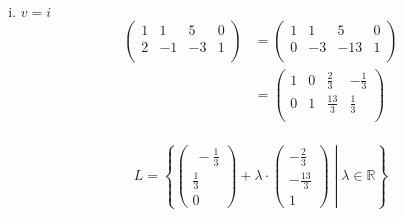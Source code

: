 \documentclass{article}
\begin{document}
\begin{enumerate}[(i)]
\begin{align*}
\begin{array}{cccc|c}
      0 & 1 & 0 & 0  & -\frac{14}{37} \\
      0 & 0 & 1 & 0  & \frac{57}{37}  \\
      0 & 0 & 0 & 1  & \frac{3}{37}   \\
    \end{array}
    \right) \\
  \end{align*}
  \[
    L = \left\{\begin{pmatrix}-\frac{1}{37} \\ -\frac{14}{37} \\ \frac{57}{37} \\ \frac{3}{37} \end{pmatrix}\right\}
  \]

  Es existiert genau eine Lösung. Damit ist $1_2$ als Linearkombination der Vektoren darstellbar und diese Darstellung ist eindeutig.
  
\item $v = i$
  \begin{align*}
    \left(
    \begin{array}{ccc|c}
      1 & 1  & 5  & 0 \\
      2 & -1 & -3 & 1 \\
    \end{array}
    \right)
    &=
    \left(
    \begin{array}{ccc|c}
      1 & 1  & 5   & 0 \\
      0 & -3 & -13 & 1 \\
    \end{array}
    \right) \\
    &=
    \left(
    \begin{array}{ccc|c}
      1 & 0 & \frac{2}{3}  & -\frac{1}{3} \\
      0 & 1 & \frac{13}{3} & \frac{1}{3} \\
    \end{array}
    \right) \\
  \end{align*}

  \[
    L = \left\{
      \begin{pmatrix}\
        -\frac{1}{3} \\
        \frac{1}{3} \\
        0
      \end{pmatrix}
      + \lambda \cdot
      \begin{pmatrix}
        -\frac{2}{3} \\
        -\frac{13}{3} \\
        1
      \end{pmatrix}
      \middle| \lambda \in \mathbb{R} \right\}
  \]


\end{enumerate}
\end{document}
